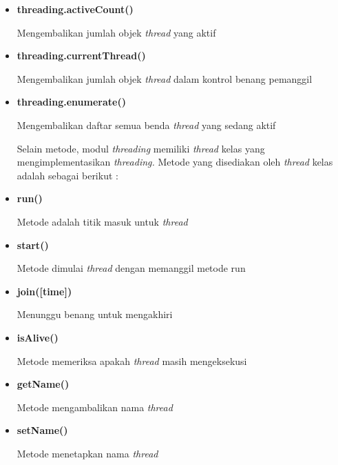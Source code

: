 \begin{itemize}
\item \textbf{t}\textbf{hreading.activeCount() } \par
Mengembalikan jumlah objek \textit{thread} yang aktif \par
\item \textbf{t}\textbf{hreading.currentThread() } \par
Mengembalikan jumlah objek \textit{thread} dalam kontrol benang pemanggil \par
\item \textbf{t}\textbf{hreading.enumerate() } \par
Mengembalikan daftar semua benda \textit{thread}\textit{ }yang sedang aktif \par

\vspace{12pt}
\hspace*{0.5in} Selain metode, modul \textit{thread}\textit{ing }memiliki \textit{thread}\textit{ }kelas yang mengimplementasikan \textit{thread}\textit{ing. }Metode yang disediakan oleh \textit{thread}\textit{ }kelas adalah sebagai berikut : \par
\item \textbf{run()} \par
Metode adalah titik masuk untuk \textit{thread} \par
\item \textbf{start()} \par
Metode dimulai\textbf{ }\textit{thread}\textit{ }dengan memanggil metode run \par
\item \textbf{join(}\textbf{[time]}\textbf{)} \par
Menunggu benang untuk mengakhiri \par
\item \textbf{isAlive()} \par
Metode memeriksa apakah\textbf{ }\textit{thread}\textit{ }masih mengeksekusi\textbf{ } \par
\item \textbf{getName()} \par
Metode mengambalikan nama\textbf{ }\textit{thread} \par
\item \textbf{setName()} \par
Metode menetapkan nama\textbf{ }\textit{thread} \par

\vspace{12pt}

\end{itemize}
